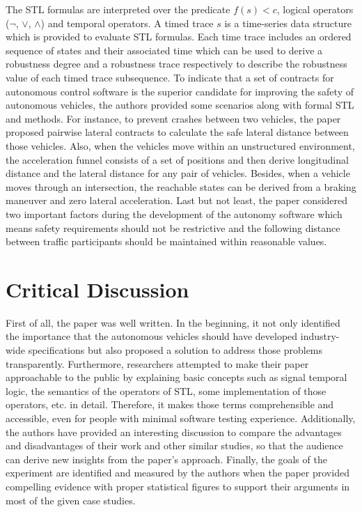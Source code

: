 \documentclass[10pt,a4paper]{report}
\begin{document}
The STL formulas are interpreted over the predicate $f(s) < c$, logical operators ($\neg$, $\lor$, $\land$) and temporal operators.
%
A timed trace $s$ is a time-series data structure which is provided to evaluate STL formulas.
%
Each time trace includes an ordered sequence of states and their associated time which can be used to derive a robustness degree and a robustness trace respectively to describe the robustness value of each timed trace subsequence.
%
To indicate that a set of contracts for autonomous control software is the superior candidate for improving the safety of autonomous vehicles, the authors provided some scenarios along with formal STL and methods.
%
For instance, to prevent crashes between two vehicles, the paper proposed pairwise lateral contracts to calculate the safe lateral distance between those vehicles.
%
Also, when the vehicles move within an unstructured environment, the acceleration funnel consists of a set of positions and then derive longitudinal distance and the lateral distance for any pair of vehicles.
%
Besides, when a vehicle moves through an intersection, the reachable states can be derived from a braking maneuver and zero lateral acceleration.
%
Last but not least, the paper considered two important factors during the development of the autonomy software which means safety requirements should not be restrictive and the following distance between traffic participants should be maintained within reasonable values.

\section{Critical Discussion}
First of all, the paper was well written. In the beginning, it not only identified the importance that the autonomous vehicles should have developed industry-wide speciﬁcations but also proposed a solution to address those problems transparently.
%
Furthermore, researchers attempted to make their paper approachable to the public by explaining basic concepts such as signal temporal logic, the semantics of the operators of STL, some implementation of those operators, etc. in detail. 
%
Therefore, it makes those terms comprehensible and accessible, even for people with minimal software testing experience.
%
Additionally, the authors have provided an interesting discussion to compare the advantages and disadvantages of their work and other similar studies, so that the audience can derive new insights from the paper's approach.
%
Finally, the goals of the experiment are identified and measured by the authors when the paper provided compelling evidence with proper statistical figures to support their arguments in most of the given case studies.
%
\end{document}
